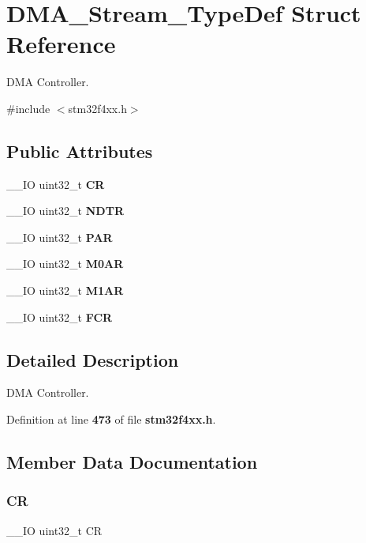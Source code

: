 \section{D\+M\+A\+\_\+\+Stream\+\_\+\+Type\+Def Struct Reference}
\label{structDMA__Stream__TypeDef}


D\+MA Controller.  




{\ttfamily \#include $<$stm32f4xx.\+h$>$}

\subsection*{Public Attributes}
\begin{DoxyCompactItemize}
\item 
\+\_\+\+\_\+\+IO uint32\+\_\+t \textbf{ CR}
\item 
\+\_\+\+\_\+\+IO uint32\+\_\+t \textbf{ N\+D\+TR}
\item 
\+\_\+\+\_\+\+IO uint32\+\_\+t \textbf{ P\+AR}
\item 
\+\_\+\+\_\+\+IO uint32\+\_\+t \textbf{ M0\+AR}
\item 
\+\_\+\+\_\+\+IO uint32\+\_\+t \textbf{ M1\+AR}
\item 
\+\_\+\+\_\+\+IO uint32\+\_\+t \textbf{ F\+CR}
\end{DoxyCompactItemize}


\subsection{Detailed Description}
D\+MA Controller. 

Definition at line \textbf{ 473} of file \textbf{ stm32f4xx.\+h}.



\subsection{Member Data Documentation}
\mbox{\label{structDMA__Stream__TypeDef_ab40c89c59391aaa9d9a8ec011dd0907a}} 
\subsubsection{CR}
{\footnotesize\ttfamily \+\_\+\+\_\+\+IO uint32\+\_\+t CR}

